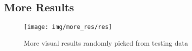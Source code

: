 \begin{appendices}
\section{More Results}
\begin{figure*}[htbp]
	\centering
	\texttt{[image: img/more\_res/res]}
	\caption{More visual results randomly picked from testing data}
	\label{fig:more_res}
\end{figure*}
\end{appendices}